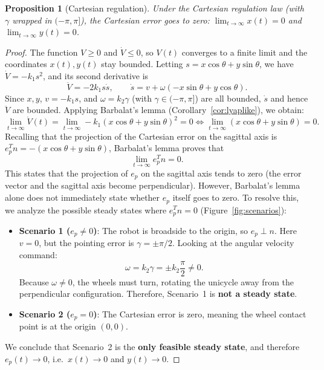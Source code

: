 \documentclass[11pt,a4paper]{article}
\def\bm#1{#1}%
\theoremstyle{definition}
\theoremstyle{plain}
\newtheorem{proposition}[definition]{Proposition}
\theoremstyle{remark}
\begin{document}
\begin{proposition}[Cartesian regulation]\label{prop:cart}
Under the Cartesian regulation law (with $\gamma$ wrapped in $(-\pi,\pi]$), the Cartesian error goes to zero: $\lim_{t\to\infty}x(t)=0$ and $\lim_{t\to\infty}y(t)=0$.
\end{proposition}

\begin{proof}
The function $V\ge0$ and $\dot V\le0$, so $V(t)$ converges to a finite limit and the coordinates $x(t),y(t)$ stay bounded.
Letting $s = x\cos\theta+y\sin\theta$, we have $\dot V = -k_1s^2$, and its second derivative is
\[
\ddot V = -2k_1s\dot s,\qquad \dot s = v + \omega(-x\sin\theta+y\cos\theta).
\]
Since $x,y$, $v = -k_1s$, and $\omega = k_2\gamma$ (with $\gamma\in(-\pi,\pi]$) are all bounded, $\dot s$ and hence $\ddot V$ are bounded.
Applying Barbalat's lemma (Corollary~\ref{cor:lyaplike}), we obtain:
\[
\lim_{t\to\infty} \dot V(t) = \lim_{t\to\infty} -k_1(x\cos\theta+y\sin\theta)^2 = 0 \iff \lim_{t\to\infty}(x\cos\theta+y\sin\theta)=0 .
\]
Recalling that the projection of the Cartesian error on the sagittal axis is $\bm e_p^T\bm n = -(x\cos\theta+y\sin\theta)$, Barbalat's lemma proves that
\[
\lim_{t\to\infty}\bm e_p^T\bm n = 0 .
\]
This states that the projection of $\bm e_p$ on the sagittal axis tends to zero (the error vector and the sagittal axis become perpendicular). However, Barbalat's lemma alone does not immediately state whether $\bm e_p$ itself goes to zero.
To resolve this, we analyze the possible steady states where $\bm e_p^T\bm n = 0$ (Figure~\ref{fig:scenarios}):
\begin{itemize}[leftmargin=*]
\item \textbf{Scenario 1 ($\bm e_p\ne\bm 0$)}: The robot is broadside to the origin, so $\bm e_p\perp\bm n$. Here $v=0$, but the pointing error is $\gamma=\pm\pi/2$. Looking at the angular velocity command:
\[
\omega = k_2\gamma = \pm k_2\frac{\pi}{2} \ne 0.
\]
Because $\omega\ne0$, the wheels must turn, rotating the unicycle away from the perpendicular configuration. Therefore, Scenario~1 is \textbf{not a steady state}.
\item \textbf{Scenario 2 ($\bm e_p=\bm 0$)}: The Cartesian error is zero, meaning the wheel contact point is at the origin $(0,0)$.
\end{itemize}
We conclude that Scenario~2 is the \textbf{only feasible steady state}, and therefore $\bm e_p(t)\to\bm 0$, i.e.\ $x(t)\to0$ and $y(t)\to0$.
\end{proof}
\end{document}
